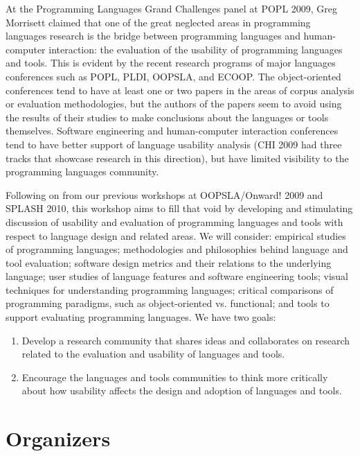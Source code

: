 \documentclass[authorpermission]{sigplanconf}
\begin{document}
At the Programming Languages Grand Challenges panel at POPL 2009, Greg
Morrisett claimed that one of the great neglected areas in programming
languages research is the bridge between programming languages and
human-computer interaction: the evaluation of the usability of
programming languages and tools. This is evident by the recent
research programs of major languages conferences such as POPL, PLDI,
OOPSLA, and ECOOP. The object-oriented conferences tend to have at
least one or two papers in the areas of corpus analysis or evaluation
methodologies, but the authors of the papers seem to avoid using the
results of their studies to make conclusions about the languages or
tools themselves. Software engineering and human-computer interaction
conferences tend to have better support of language usability analysis
(CHI 2009 had three tracks that showcase research in this direction),
but have limited visibility to the programming languages community.

Following on from our previous workshops at OOPSLA/Onward! 
2009 and SPLASH 2010, this workshop aims to fill that void by
developing and stimulating discussion of usability and evaluation of
programming languages and tools with respect to language design and
related areas. We will consider: empirical studies of programming
languages; methodologies and philosophies behind language and tool
evaluation; software design metrics and their relations to the
underlying language; user studies of language features and software
engineering tools; visual techniques for understanding programming
languages; critical comparisons of programming paradigms, such as
object-oriented vs. functional; and tools to support evaluating
programming languages. We have two goals:

\begin{enumerate}
  \item 
Develop a research community that shares ideas and collaborates on 
research related to the evaluation and usability of languages and tools.
\item
Encourage the languages and tools communities to think more critically
about how usability affects the  design and adoption of languages and tools.
\end{enumerate}


\section{Organizers}
\end{document}
